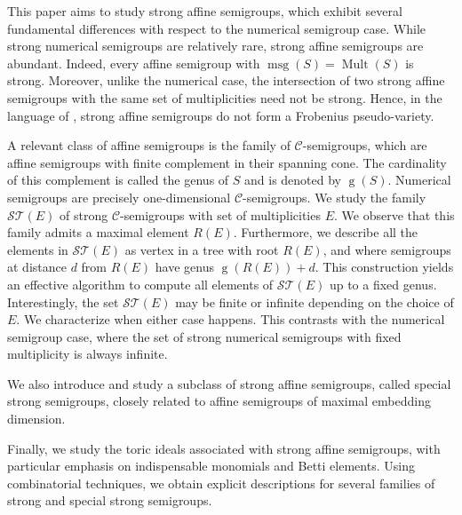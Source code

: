 \documentclass[a4paper,11pt]{article}
\def\CaC{\mathcal{C}}
\def\msg{\operatorname{msg}}
\def\g{\operatorname{g}}
\def\Mult{\operatorname{Mult}}
\begin{document}
{This paper aims to study strong affine semigroups, which exhibit several fundamental differences with respect to the numerical semigroup case. While strong numerical semigroups are relatively rare, strong affine semigroups are abundant. Indeed, every affine semigroup with $\msg(S) = \Mult(S)$ is strong. Moreover, unlike the numerical case, the intersection of two strong affine semigroups with the same set of multiplicities need not be strong. Hence, in the language of \cite{PseudoFrobeniusVariety}, strong affine semigroups do not form a Frobenius pseudo-variety.

A relevant class of affine semigroups is the family of $\CaC$-semigroups, which are affine semigroups with finite complement in their spanning cone. The cardinality of this complement is called the genus of $S$ and is denoted by $\g(S)$.
Numerical semigroups are precisely one-dimensional $\mathcal{C}$-semigroups.
We study the family $\mathcal{ST}(E)$ of strong $\CaC$-semigroups with set of multiplicities $E$. We observe that this family admits a maximal element $R(E)$. Furthermore, we describe all the elements in $\mathcal{ST}(E)$ as vertex in a tree with root $R(E)$, and where semigroups at distance $d$ from $R(E)$ have genus $\g(R(E)) + d$.
 This construction yields an effective algorithm to compute all elements of $\mathcal{ST}(E)$ up to a fixed genus.
Interestingly, the set $\mathcal{ST}(E)$ may be finite or infinite depending on the choice of $E$. We characterize when either case happens. This contrasts with the numerical semigroup case, where the set of strong numerical semigroups with fixed multiplicity is always infinite.

We also introduce and study a subclass of strong affine semigroups, called special strong semigroups, closely related to affine semigroups of maximal embedding dimension.

Finally, we study the toric ideals associated with strong affine semigroups, with particular emphasis on indispensable monomials and Betti elements. Using combinatorial techniques, we obtain explicit descriptions for several families of strong and special strong semigroups.

}
\end{document}
